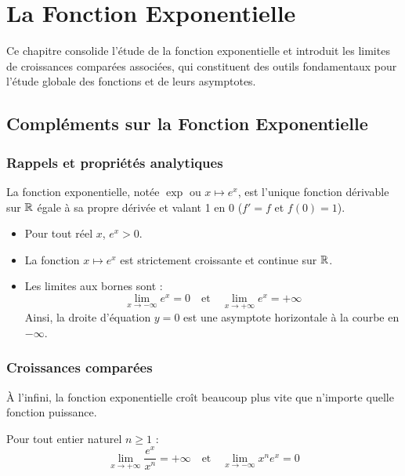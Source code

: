 \chapter{La Fonction Exponentielle}

Ce chapitre consolide l'étude de la fonction exponentielle et introduit les limites de croissances comparées associées, qui constituent des outils fondamentaux pour l'étude globale des fonctions et de leurs asymptotes.

\section{Compléments sur la Fonction Exponentielle}

\subsection{Rappels et propriétés analytiques}

La fonction exponentielle, notée $\exp$ ou $x \mapsto e^x$, est l'unique fonction dérivable sur $\mathbb{R}$ égale à sa propre dérivée et valant 1 en 0 ($f' = f$ et $f(0)=1$).

\begin{propriete}
\begin{itemize}
    \item Pour tout réel $x$, $e^x > 0$.
    \item La fonction $x \mapsto e^x$ est strictement croissante et continue sur $\mathbb{R}$.
    \item Les limites aux bornes sont :
    \[
    \lim_{x \to -\infty} e^x = 0 \quad \text{et} \quad \lim_{x \to +\infty} e^x = +\infty
    \]
    Ainsi, la droite d'équation $y=0$ est une asymptote horizontale à la courbe en $-\infty$.
\end{itemize}
\end{propriete}

\subsection{Croissances comparées}

À l'infini, la fonction exponentielle croît beaucoup plus vite que n'importe quelle fonction puissance.

\begin{theoreme}
Pour tout entier naturel $n \ge 1$ :
\[
\lim_{x \to +\infty} \frac{e^x}{x^n} = +\infty \quad \text{et} \quad \lim_{x \to -\infty} x^n e^x = 0
\]
\end{theoreme}



